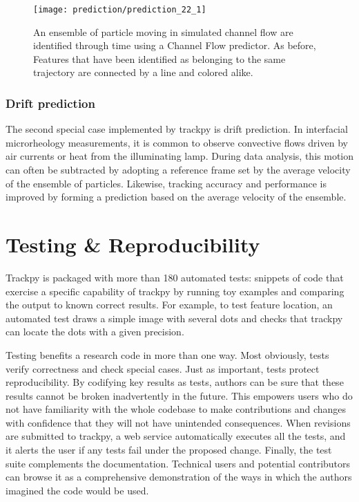    \begin{figure}
    \centering
    \texttt{[image: prediction/prediction\_22\_1]}
    \caption{\label{fig:prediction-channel-channel-link}An ensemble of particle moving in simulated channel flow are identified through time using a Channel Flow predictor. As before, Features that have been identified as belonging to the same trajectory are connected by a line and colored alike. }
    \end{figure}

    \subsubsection{Drift prediction}\label{drift-prediction}
    
The second special case implemented by trackpy is drift prediction. In interfacial microrheology measurements, it is common to observe convective flows driven by air currents or heat from the illuminating lamp. During data analysis, this motion can often be subtracted by adopting a reference frame set by the average velocity of the ensemble of particles. Likewise, tracking accuracy and performance is improved by forming a prediction based on the average velocity of the ensemble.

\section{\label{sec:testing}Testing \& Reproducibility}

Trackpy is packaged with more than 180 automated tests: snippets of code that exercise a specific capability of trackpy by running toy examples and comparing the output to known correct results. For example, to test feature location, an automated test draws a simple image with several dots and checks that trackpy can locate the dots with a given precision.

Testing benefits a research code in more than one way. Most obviously, tests verify correctness and check special cases. Just as important, tests protect reproducibility. By codifying key results as tests, authors can be sure that these results cannot be broken inadvertently in the future. This empowers users who do not have familiarity with the whole codebase to make contributions and changes with confidence that they will not have unintended consequences. When revisions are submitted to trackpy, a web service automatically executes all the tests, and it alerts the user if any tests fail under the proposed change. Finally, the test suite complements the documentation. Technical users and potential contributors can browse it as a comprehensive demonstration of the ways in which the authors imagined the code would be used.

